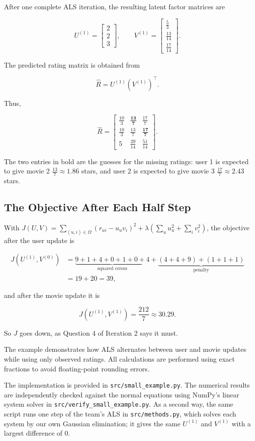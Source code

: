 After one complete ALS iteration, the resulting
latent factor matrices are

\[
U^{(1)} =
\begin{bmatrix}
2\\
2\\
3
\end{bmatrix},
\qquad
V^{(1)} =
\begin{bmatrix}
\frac{5}{3}\\
\frac{13}{14}\\
\frac{17}{14}
\end{bmatrix}.
\]

The predicted rating matrix is obtained from

\[
\widehat{R}=U^{(1)}(V^{(1)})^\top.
\]

Thus,

\[
\widehat{R} =
\begin{bmatrix}
\frac{10}{3} & \mathbf{\frac{13}{7}} & \frac{17}{7}\\
\frac{10}{3} & \frac{13}{7} & \mathbf{\frac{17}{7}}\\
5 & \frac{39}{14} & \frac{51}{14}
\end{bmatrix}.
\]

The two entries in bold are the guesses for the missing
ratings: user 1 is expected to give movie 2
$\frac{13}{7}\approx1.86$ stars, and user 2 is expected to
give movie 3 $\frac{17}{7}\approx2.43$ stars.

\subsection{The Objective After Each Half Step}

With
$J(U,V)=\sum_{(u,i)\in\Omega}(r_{ui}-u_uv_i)^2
+\lambda\left(\sum_u u_u^2+\sum_i v_i^2\right)$,
the objective after the user update is

\[
\begin{aligned}
J(U^{(1)},V^{(0)})
&=\underbrace{9+1+4+0+1+0+4}_{\text{squared errors}}
+\underbrace{(4+4+9)+(1+1+1)}_{\text{penalty}}\\
&=19+20=39,
\end{aligned}
\]

and after the movie update it is

\[
J(U^{(1)},V^{(1)})=\frac{212}{7}\approx30.29.
\]

So $J$ goes down, as Question 4 of Iteration 2 says it
must.

The example demonstrates how ALS alternates between
user and movie updates while using only observed ratings.
All calculations are performed using exact fractions
to avoid floating-point rounding errors.

The implementation is provided in
\texttt{src/small\_example.py}.
The numerical results are independently checked against
the normal equations using NumPy's linear system solver
in \texttt{src/verify\_small\_example.py}. As a second way,
the same script runs one step of the team's ALS in
\texttt{src/methods.py}, which solves each system by our own
Gaussian elimination; it gives the same $U^{(1)}$ and
$V^{(1)}$ with a largest difference of 0.
